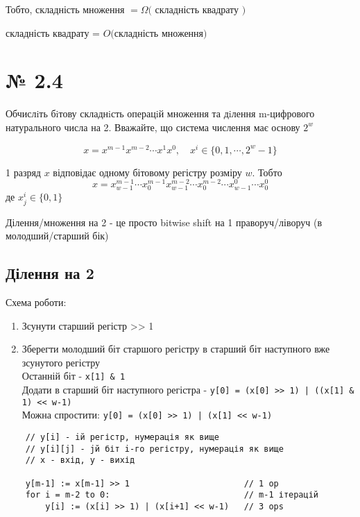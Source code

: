 \documentclass[11pt, a4paper]{article} %
\begin{document}
Тобто, складність множення $= \Omega($ складність квадрату $)$

складність квадрату = $O($складність множення$)$ \qedsymbol


\section*{№ 2.4}
\begin{mdframed}
    Обчислiть бiтову складнiсть операцiй множення та дiлення m-цифрового натурального числа на 2. 
    Вважайте, що система числення має основу $2^w$
\end{mdframed}

$$x = x^{m-1}x^{m-2}\cdots x^1 x^0, \quad x^i \in \{0,1,\cdots , 2^w - 1\}$$

1 разряд $x$ відповідає одному бітовому регістру розміру $w$.
Тобто 
$$x = \boxed{x_{w-1}^{m-1} \cdots x_0^{m-1}} \boxed{x_{w-1}^{m-2} \cdots x_0^{m-2}} \cdots \boxed{x_{w-1}^{0} \cdots x_0^{0}} $$ 
де $x^i_j \in \{0,1\}$

Ділення/множення на 2 - це просто bitwise shift на 1 праворуч/ліворуч (в молодший/старший бік)

\subsection*{Ділення на 2}
Схема роботи:
\begin{enumerate}
    \item Зсунути старший регістр >> 1
    \item Зберегти молодший біт старшого регістру в старший біт наступного вже зсунутого регістру\\
    Останній біт - \texttt{x[1] \& 1}\\
    Додати в старший біт наступного регістра - \texttt{y[0] = (x[0] >> 1) | ((x[1] \& 1) << w-1)}\\
    Можна спростити: \texttt{y[0] = (x[0] >> 1) | (x[1] << w-1)}
\end{enumerate}

\begin{lstlisting}
    // y[i] - iй регістр, нумерація як вище
    // y[i][j] - jй біт i-го регістру, нумерація як вище
    // x - вхід, y - вихід

    y[m-1] := x[m-1] >> 1                       // 1 op
    for i = m-2 to 0:                           // m-1 ітерацій
        y[i] := (x[i] >> 1) | (x[i+1] << w-1)   // 3 ops
\end{lstlisting}
\end{document}
